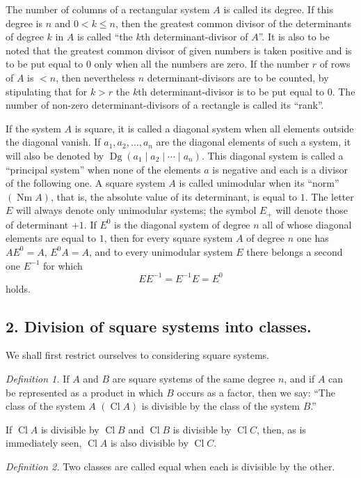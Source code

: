 \documentclass[11pt,a4paper]{article}
\newcommand{\Cl}{\operatorname{Cl}}
\newcommand{\Nm}{\operatorname{Nm}}
\newcommand{\Dg}{\operatorname{Dg}}
\begin{document}
The number of columns of a rectangular system $A$ is called its degree. If this degree is $n$ and $0<k\le n$, then the greatest common divisor of the determinants of degree $k$ in $A$ is called ``the $k$th determinant-divisor of $A$''. It is also to be noted that the greatest common divisor of given numbers is taken positive and is to be put equal to $0$ only when all the numbers are zero. If the number $r$ of rows of $A$ is $<n$, then nevertheless $n$ determinant-divisors are to be counted, by stipulating that for $k>r$ the $k$th determinant-divisor is to be put equal to $0$. The number of non-zero determinant-divisors of a rectangle is called its ``rank''.

If the system $A$ is square, it is called a diagonal system when all elements outside the diagonal vanish. If $a_1,a_2,\ldots,a_n$ are the diagonal elements of such a system, it will also be denoted by $\Dg(a_1\mid a_2\mid\cdots\mid a_n)$. This diagonal system is called a ``principal system'' when none of the elements $a$ is negative and each is a divisor of the following one. A square system $A$ is called unimodular when its ``norm'' $(\Nm A)$, that is, the absolute value of its determinant, is equal to $1$. The letter $E$ will always denote only unimodular systems; the symbol $E_+$ will denote those of determinant $+1$. If $E^0$ is the diagonal system of degree $n$ all of whose diagonal elements are equal to $1$, then for every square system $A$ of degree $n$ one has $AE^0=A$, $E^0A=A$, and to every unimodular system $E$ there belongs a second one $E^{-1}$ for which
\[
EE^{-1}=E^{-1}E=E^0
\]
holds.

\subsection*{2. Division of square systems into classes.}

We shall first restrict ourselves to considering square systems.

\emph{Definition 1.} If $A$ and $B$ are square systems of the same degree $n$, and if $A$ can be represented as a product in which $B$ occurs as a factor, then we say: ``The class of the system $A$ $(\Cl A)$ is divisible by the class of the system $B$.''

If $\Cl A$ is divisible by $\Cl B$ and $\Cl B$ is divisible by $\Cl C$, then, as is immediately seen, $\Cl A$ is also divisible by $\Cl C$.

\emph{Definition 2.} Two classes are called equal when each is divisible by the other.
\end{document}

